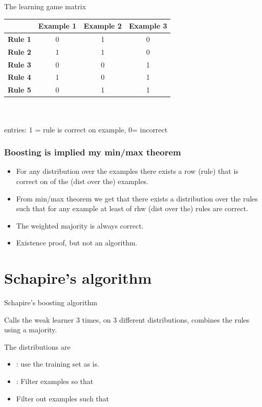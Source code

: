 \documentclass{beamer}
\begin{document}
\begin{frame}{The learning game matrix}
  \centering
  \begin{tabular}{lccc}
    \hline
    & \textbf{Example 1} & \textbf{Example 2} & \textbf{Example 3} \\
    \hline
    \textbf{Rule 1} & 0 & 1 & 0 \\
    \textbf{Rule 2} & 1 & 1 & 0 \\
    \textbf{Rule 3} & 0 & 0 & 1 \\
    \textbf{Rule 4} & 1 & 0 & 1 \\
    \textbf{Rule 5} & 0 & 1 & 1 \\
    \hline
  \end{tabular}
  ~\\~\\
  
  entries: 1 = rule is correct on example, 0= incorrect
\end{frame}

\begin{frame}
  \frametitle{Boosting is implied my min/max theorem}
  \begin{itemize}
  \item For any distribution  over the examples there exists a row
    (rule) that is correct on  of the (dist over the) examples.
  \item From min/max theorem we get that there exists a distribution  over the rules such that for any example at least of rhw (dist over the) rules are correct.
  \item The weighted majority is always correct.
  \item Existence proof, but not an algorithm.
  \end{itemize}
\end{frame}

\section{Schapire's algorithm}
\begin{frame}{Schapire's boosting algorithm}

  Calls the weak learner 3 times, on 3 different distributions, combines the rules using a majority.

  The distributions are
  \begin{itemize}
  \item {}: use the training set as is.
  \item {}: Filter examples so that 
    \item {} Filter out examples such that 
  \end{itemize}
  
\end{frame}
\end{document}
